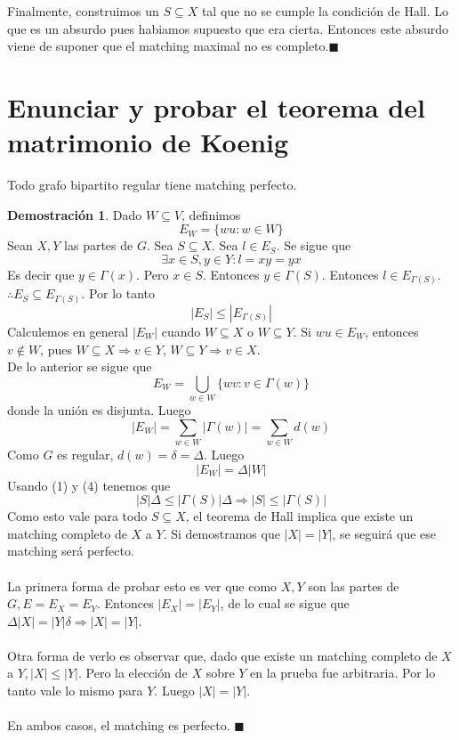 \documentclass[11pt, a4paper]{article}
\theoremstyle{definition}
\newtheorem*{demostracion}{Demostración}
\begin{document}
Finalmente, construimos un \(S \subseteq X\) tal que no se cumple la condición de Hall. Lo que es un absurdo pues habiamos supuesto que era cierta. Entonces este absurdo viene de suponer que el matching maximal no es completo.$\blacksquare$

\section{Enunciar y probar el teorema del matrimonio de Koenig}

Todo grafo bipartito regular tiene matching perfecto.

\begin{demostracion}
Dado $W \subseteq V$, definimos
\[
E_W = \{wu : w \in W\}
\]
Sean $X, Y$ las partes de $G$. Sea $S \subseteq X$. Sea $l \in E_S$. Se sigue que
\[
\exists x \in S, y \in Y : l = xy = yx
\]
Es decir que $y \in \Gamma(x)$. Pero $x \in S$. Entonces $y \in \Gamma(S)$. Entonces $l \in E_{\Gamma(S)}$. $\therefore E_S \subseteq E_{\Gamma(S)}$. Por lo tanto
\[
|E_S| \leq |E_{\Gamma(S)}| \tag{1}
\]
Calculemos en general $|E_W|$ cuando $W \subseteq X$ o $W\subseteq Y$. Si $wu \in E_W$, entonces $v \notin W$, pues $W \subseteq X \Rightarrow v \in Y$, $W \subseteq Y \Rightarrow v \in X$.\\
De lo anterior se sigue que
\[
E_W = \bigcup_{w \in W} \{wv : v \in \Gamma(w)\} \tag{2}
\]
donde la unión es disjunta. Luego
\[
|E_W| = \sum_{w \in W} |\Gamma(w)| = \sum_{w \in W} d(w) \tag{3}
\]
Como $G$ es regular, $d(w) = \delta = \Delta$. Luego
\[
|E_W| = \Delta |W| \tag{4}
\]
Usando (1) y (4) tenemos que
\[
|S| \Delta \leq |\Gamma(S)| \Delta \Rightarrow |S| \leq |\Gamma(S)| \tag{5}
\]
Como esto vale para todo $S \subseteq X$, el teorema de Hall implica que existe un matching completo de $X$ a $Y$. Si demostramos que $|X| = |Y|$, se seguirá que ese matching será perfecto.\\ \\
La primera forma de probar esto es ver que como $X, Y$ son las partes de $G, E = E_X = E_Y$. Entonces $|E_X| = |E_Y|$, de lo cual se sigue que $\Delta |X| = |Y| \delta \Rightarrow |X| = |Y|$.\\ \\
Otra forma de verlo es observar que, dado que existe un matching completo de $X$ a $Y, |X| \leq |Y|$. Pero la elección de $X$ sobre $Y$ en la prueba fue arbitraria. Por lo tanto vale lo mismo para $Y$. Luego $|X| = |Y|$.\\ \\
En ambos casos, el matching es perfecto. $\blacksquare$
\end{demostracion}
\end{document}
